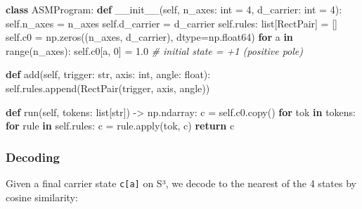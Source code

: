 \documentclass[
  twocolumn,
  10pt,
  a4paper]{article}
\newenvironment{Shaded}{}{}
\newcommand{\BuiltInTok}[1]{\textcolor[rgb]{0.00,0.50,0.00}{#1}}
\newcommand{\CommentTok}[1]{\textcolor[rgb]{0.38,0.63,0.69}{\textit{#1}}}
\newcommand{\ControlFlowTok}[1]{\textcolor[rgb]{0.00,0.44,0.13}{\textbf{#1}}}
\newcommand{\DecValTok}[1]{\textcolor[rgb]{0.25,0.63,0.44}{#1}}
\newcommand{\FloatTok}[1]{\textcolor[rgb]{0.25,0.63,0.44}{#1}}
\newcommand{\FunctionTok}[1]{\textcolor[rgb]{0.02,0.16,0.49}{#1}}
\newcommand{\KeywordTok}[1]{\textcolor[rgb]{0.00,0.44,0.13}{\textbf{#1}}}
\newcommand{\NormalTok}[1]{#1}
\newcommand{\OperatorTok}[1]{\textcolor[rgb]{0.40,0.40,0.40}{#1}}
\newcommand{\VariableTok}[1]{\textcolor[rgb]{0.10,0.09,0.49}{#1}}
\begin{document}
\begin{Shaded}
\begin{Highlighting}[]
\KeywordTok{class}\NormalTok{ ASMProgram:}
    \KeywordTok{def} \FunctionTok{\_\_init\_\_}\NormalTok{(}\VariableTok{self}\NormalTok{, n\_axes: }\BuiltInTok{int} \OperatorTok{=} \DecValTok{4}\NormalTok{, d\_carrier: }\BuiltInTok{int} \OperatorTok{=} \DecValTok{4}\NormalTok{):}
        \VariableTok{self}\NormalTok{.n\_axes }\OperatorTok{=}\NormalTok{ n\_axes}
        \VariableTok{self}\NormalTok{.d\_carrier }\OperatorTok{=}\NormalTok{ d\_carrier}
        \VariableTok{self}\NormalTok{.rules: }\BuiltInTok{list}\NormalTok{[RectPair] }\OperatorTok{=}\NormalTok{ []}
        \VariableTok{self}\NormalTok{.c0 }\OperatorTok{=}\NormalTok{ np.zeros((n\_axes, d\_carrier), dtype}\OperatorTok{=}\NormalTok{np.float64)}
        \ControlFlowTok{for}\NormalTok{ a }\KeywordTok{in} \BuiltInTok{range}\NormalTok{(n\_axes):}
            \VariableTok{self}\NormalTok{.c0[a, }\DecValTok{0}\NormalTok{] }\OperatorTok{=} \FloatTok{1.0}  \CommentTok{\# initial state = +1 (positive pole)}

    \KeywordTok{def}\NormalTok{ add(}\VariableTok{self}\NormalTok{, trigger: }\BuiltInTok{str}\NormalTok{, axis: }\BuiltInTok{int}\NormalTok{, angle: }\BuiltInTok{float}\NormalTok{):}
        \VariableTok{self}\NormalTok{.rules.append(RectPair(trigger, axis, angle))}

    \KeywordTok{def}\NormalTok{ run(}\VariableTok{self}\NormalTok{, tokens: }\BuiltInTok{list}\NormalTok{[}\BuiltInTok{str}\NormalTok{]) }\OperatorTok{{-}\textgreater{}}\NormalTok{ np.ndarray:}
\NormalTok{        c }\OperatorTok{=} \VariableTok{self}\NormalTok{.c0.copy()}
        \ControlFlowTok{for}\NormalTok{ tok }\KeywordTok{in}\NormalTok{ tokens:}
            \ControlFlowTok{for}\NormalTok{ rule }\KeywordTok{in} \VariableTok{self}\NormalTok{.rules:}
\NormalTok{                c }\OperatorTok{=}\NormalTok{ rule.}\BuiltInTok{apply}\NormalTok{(tok, c)}
        \ControlFlowTok{return}\NormalTok{ c}
\end{Highlighting}
\end{Shaded}

\hypertarget{decoding}{%
\subsubsection{Decoding}\label{decoding}}

Given a final carrier state \texttt{c{[}a{]}} on S³, we decode to the
nearest of the 4 states by cosine similarity:
\end{document}
